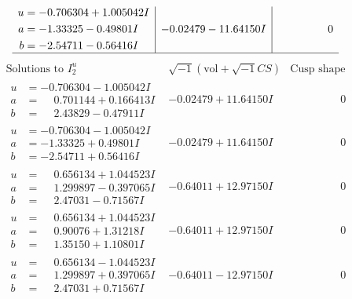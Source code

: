\documentclass[1p]{elsarticle_modified}
\theoremstyle{definition}
\newcommand{\I}{\sqrt{-1}}
\begin{document}
$$\begin{array}{c|c|c}
\begin{aligned}
u &= -0.706304 + 1.005042 I \\
a &= -1.33325 - 0.49801 I \\
b &= -2.54711 - 0.56416 I\end{aligned}
 & -0.02479 - 11.64150 I & \phantom{-0.000000 } 0\\
 \hline 
 \end{array}$$\newpage$$\begin{array}{c|c|c}  
\text{Solutions to }I^u_{2}& \I (\text{vol} + \sqrt{-1}CS) & \text{Cusp shape}\\
 \hline 
\begin{aligned}
u &= -0.706304 - 1.005042 I \\
a &= \phantom{-}0.701144 + 0.166413 I \\
b &= \phantom{-}2.43829 - 0.47911 I\end{aligned}
 & -0.02479 + 11.64150 I & \phantom{-0.000000 } 0 \\ \hline\begin{aligned}
u &= -0.706304 - 1.005042 I \\
a &= -1.33325 + 0.49801 I \\
b &= -2.54711 + 0.56416 I\end{aligned}
 & -0.02479 + 11.64150 I & \phantom{-0.000000 } 0 \\ \hline\begin{aligned}
u &= \phantom{-}0.656134 + 1.044523 I \\
a &= \phantom{-}1.299897 - 0.397065 I \\
b &= \phantom{-}2.47031 - 0.71567 I\end{aligned}
 & -0.64011 + 12.97150 I & \phantom{-0.000000 } 0 \\ \hline\begin{aligned}
u &= \phantom{-}0.656134 + 1.044523 I \\
a &= \phantom{-}0.90076 + 1.31218 I \\
b &= \phantom{-}1.35150 + 1.10801 I\end{aligned}
 & -0.64011 + 12.97150 I & \phantom{-0.000000 } 0 \\ \hline\begin{aligned}
u &= \phantom{-}0.656134 - 1.044523 I \\
a &= \phantom{-}1.299897 + 0.397065 I \\
b &= \phantom{-}2.47031 + 0.71567 I\end{aligned}
 & -0.64011 - 12.97150 I & \phantom{-0.000000 } 0 \\ \hline\begin{aligned}

\end{aligned}
\end{array}$$
\end{document}
